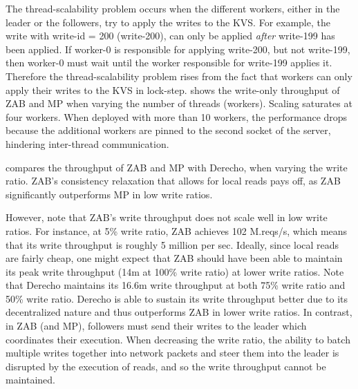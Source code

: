 The thread-scalability problem occurs when the different workers, either in the leader or the followers, try to apply the writes to the KVS. For example, the write with write-id = 200 (\ie write-200), can only be applied \emph{after} write-199 has been applied. If worker-0 is responsible for applying write-200, but not write-199, then 
worker-0 must wait until the worker responsible for write-199 applies it.
Therefore the thread-scalability problem rises from the fact that workers can only apply their writes to the KVS in lock-step.  shows the write-only throughput of ZAB and MP when varying the number of threads (\ie workers). 
Scaling saturates at four workers.
When deployed with more than 10 workers, the performance drops because the additional workers are pinned to the second socket of the server, hindering inter-thread communication.




 compares the throughput of ZAB and MP with Derecho, when varying the write ratio.
ZAB's consistency relaxation that allows for local reads pays off, as ZAB significantly outperforms MP in low write ratios. 

However, note that ZAB's write throughput does not scale well in low write ratios. For instance, at 5\% write ratio, ZAB achieves 102 M.reqs/s, which means that its write throughput is roughly 5 million per sec. Ideally, since local reads are fairly cheap, one might expect that ZAB should have been able to maintain its peak write throughput (14m at 100\% write ratio) at lower write ratios. Note that Derecho maintains its 16.6m write throughput at both 75\% write ratio and 50\% write ratio. Derecho is able to sustain its write throughput better due to its decentralized nature and thus outperforms ZAB in lower write ratios. In contrast, in ZAB (and MP), followers must send their writes to the leader which coordinates their execution. When decreasing the write ratio, the ability to batch multiple writes together into network packets and steer them into the leader is disrupted by the execution of reads, and so the write throughput cannot be maintained.



